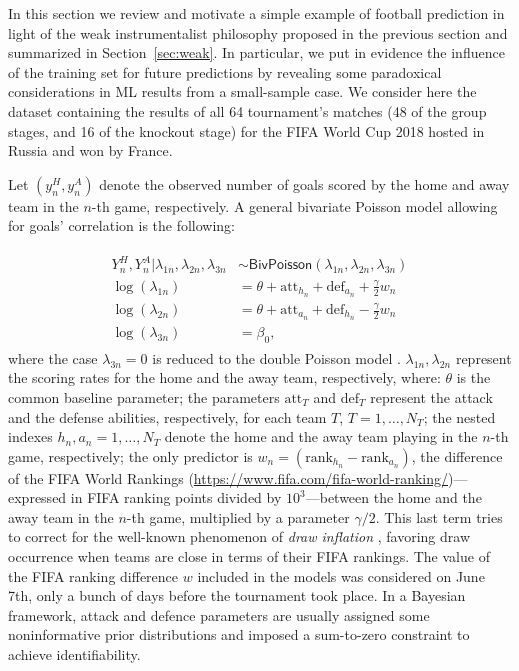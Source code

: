 \documentclass{statsoc}
\begin{document}
\color{black}

In this section we review and motivate a simple example of football prediction in light of  the weak instrumentalist philosophy proposed in the previous section and summarized in Section~\ref{sec:weak}. In particular, we put in evidence the influence of the training set for future predictions by revealing some paradoxical considerations  in ML results from  a small-sample case. We consider here the dataset containing the results of all 64 tournament's matches (48 of the group stages, and 16 of the knockout stage) for the FIFA World Cup 2018 hosted in Russia and won by France.

Let $(y^{H}_{n}, y^{A}_{n})$ denote the observed number of goals scored by the home and  away team in the $n$-th game, respectively. A general bivariate Poisson model allowing for goals' correlation \citep{karlis2003analysis} is the following:

\begin{eqnarray}
\begin{split}
Y^H_n, Y^A_n| \lambda_{1n}, \lambda_{2n}, \lambda_{3n} & \sim \mathsf{BivPoisson}(\lambda_{1n}, \lambda_{2n}, \lambda_{3n})\\ 
\log(\lambda_{1n}) & = \theta+\text{att}_{h_n}+\text{def}_{a_n}+\frac{\gamma}{2} w_n\\
\log(\lambda_{2n}) & = \theta+\text{att}_{a_n}+\text{def}_{h_n}-\frac{\gamma}{2} w_n\\
\log(\lambda_{3n}) & =\beta_0,
\end{split}
\label{eq:bivariate}
\end{eqnarray}
where the case $\lambda_{3n}=0$ is reduced to the double Poisson model \citep{baio2010bayesian}.  $\lambda_{1n}, \lambda_{2n}$ represent the scoring rates for the home and the away team, respectively, where: $\theta$ is the common baseline parameter; the parameters $\text{att}_T$ and $\text{def}_T$ represent the attack and the defense abilities, 
respectively, for each team $T$, $T=1,\ldots,N_T$; the nested indexes $h_{n}, a_{n}=1,\ldots,N_T$ denote the home and the away team playing in the $n$-th game, 
respectively; the only predictor is $w_n= (\text{rank}_{h_n}- \text{rank}_{a_n} )$, the difference of the FIFA World Rankings (\url{https://www.fifa.com/fifa-world-ranking/})---expressed in FIFA ranking points divided by $10^3$---between the home and the away team in 
the $n$-th game, multiplied by a parameter ${\gamma}/{2}$.  This last term tries to correct for the well-known phenomenon of \emph{draw inflation} \citep{karlis2003analysis}, 
favoring draw occurrence when teams are close in terms of their FIFA rankings. The value of the 
FIFA ranking difference $w$ included in the models was considered on June 7th, only a bunch 
of days before the tournament took place.  In a Bayesian framework, attack and defence parameters are usually assigned some noninformative prior distributions \citep{baio2010bayesian} and imposed a sum-to-zero constraint to achieve identifiability.
\end{document}
